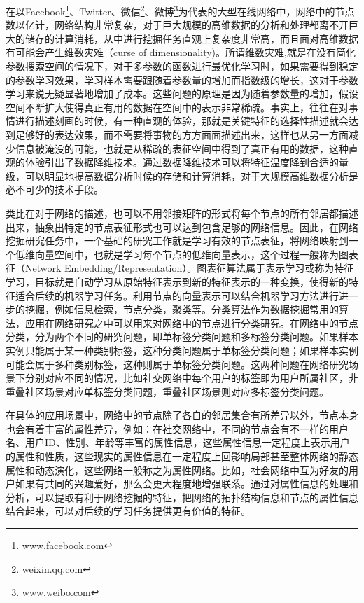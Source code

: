 在以Facebook\footnote{www.facebook.com}、Twitter、微信\footnote{weixin.qq.com}、微博\footnote{www.weibo.com}为代表的大型在线网络中，网络中的节点数以亿计，网络结构非常复杂，对于巨大规模的高维数据的分析和处理都离不开巨大的储存的计算消耗，从中进行挖掘任务直观上复杂度非常高，而且面对高维数据有可能会产生维数灾难\cite{bellman2015adaptive}（curse of dimensionality)。所谓维数灾难,就是在没有简化参数搜索空间的情况下，对于多参数的函数进行最优化学习时，如果需要得到稳定的参数学习效果，学习样本需要跟随着参数量的增加而指数级的增长，这对于参数学习来说无疑显著地增加了成本。这些问题的原理是因为随着参数量的增加，假设空间不断扩大使得真正有用的数据在空间中的表示非常稀疏。事实上，往往在对事情进行描述刻画的时候，有一种直观的体验，那就是关键特征的选择性描述就会达到足够好的表达效果，而不需要将事物的方方面面描述出来，这样也从另一方面减少信息被淹没的可能，也就是从稀疏的表征空间中得到了真正有用的数据，这种直观的体验引出了数据降维技术。通过数据降维技术可以将特征温度降到合适的量级，可以明显地提高数据分析时候的存储和计算消耗，对于大规模高维数据分析是必不可少的技术手段。

类比在对于网络的描述，也可以不用邻接矩阵的形式将每个节点的所有邻居都描述出来，抽象出特定的节点表征形式也可以达到包含足够的网络信息。因此，在网络挖掘研究任务中，一个基础的研究工作就是学习有效的节点表征，将网络映射到一个低维向量空间中\cite{chang2015heterogeneous}，也就是学习每个节点的低维向量表示，这个过程一般称为图表征（Network Embedding/Representation）。图表征算法属于表示学习或称为特征学习，目标就是自动学习从原始特征表示到新的特征表示的一种变换，使得新的特征适合后续的机器学习任务。利用节点的向量表示可以结合机器学习方法进行进一步的挖掘，例如信息检索\cite{weiss2009spectral}，节点分类\cite{krizhevsky2012imagenet}，聚类\cite{ng2002spectral}等。分类算法作为数据挖掘常用的算法，应用在网络研究之中可以用来对网络中的节点进行分类研究。在网络中的节点分类，分为两个不同的研究问题，即单标签分类问题和多标签分类问题。如果样本实例只能属于某一种类别标签，这种分类问题属于单标签分类问题；如果样本实例可能会属于多种类别标签，这种则属于单标签分类问题。这两种问题在网络研究场景下分别对应不同的情况，比如社交网络中每个用户的标签即为用户所属社区，非重叠社区场景对应单标签分类问题，重叠社区场景则对应多标签分类问题。

在具体的应用场景中，网络中的节点除了各自的邻居集合有所差异以外，节点本身也会有着丰富的属性差异，例如：在社交网络中，不同的节点会有不一样的用户名、用户ID、性别、年龄等丰富的属性信息，这些属性信息一定程度上表示用户的属性和性质，这些现实的属性信息在一定程度上回影响局部甚至整体网络的静态属性和动态演化，这些网络一般称之为属性网络。比如，社会网络中互为好友的用户如果有共同的兴趣爱好，那么会更大程度地增强联系。通过对属性信息的处理和分析，可以提取有利于网络挖掘的特征，把网络的拓扑结构信息和节点的属性信息结合起来，可以对后续的学习任务提供更有价值的特征。

